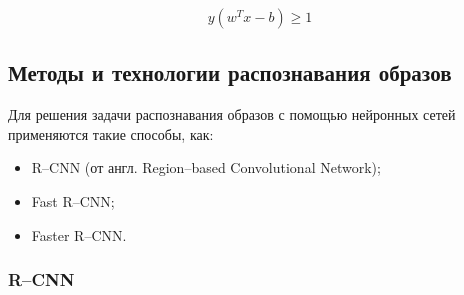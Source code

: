 \begin{equation}
	\label{eq:nn11}
	y(w^Tx-b) \geq 1
\end{equation}

\subsection{Методы и технологии распознавания образов}

Для решения задачи распознавания образов с помощью нейронных сетей применяются такие способы, как:
\begin{itemize}[leftmargin=1.6\parindent]
	\item R--CNN (от англ. Region--based Convolutional Network);
	\item Fast R--CNN;
	\item Faster R--CNN. 
\end{itemize}

\subsubsection{R--CNN}

